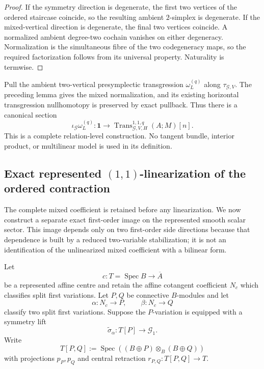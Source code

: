 \begin{proof}
If the symmetry direction is degenerate, the first two vertices of the ordered
staircase coincide, so the resulting ambient $2$-simplex is degenerate.  If the
mixed-vertical direction is degenerate, the final two vertices coincide.  A
normalized ambient degree-two cochain vanishes on either degeneracy.  Normalization
is the simultaneous fibre of the two codegeneracy maps, so the required
factorization follows from its universal property.  Naturality is termwise.
\end{proof}

\begin{construction}
\label{constr:symmetry-noether-ordered-mixed-presymplectic-contraction}
Pull the ambient two-vertical presymplectic transgression
$\omega_L^{(q)}$ along $\tau_{\mathcal G,V}$.  The preceding lemma gives the mixed
normalization, and its existing horizontal transgression nullhomotopy is preserved
by exact pullback.  Thus there is a canonical section
\[
\boxed{
\iota_{\mathcal G}\omega_L^{(q)}
:
\mathbf1
\longrightarrow
\operatorname{Trans}_{\mathcal G,V,H}^{1,1,q}(A;M)[n].
}
\]
This is a complete relation-level construction.  No tangent bundle, interior
product, or multilinear model is used in its definition.
\end{construction}

\subsection{Exact represented $(1,1)$-linearization of the ordered contraction}
\label{subsec:symmetry-noether-exact-represented-one-one-linearization}

The complete mixed coefficient is retained before any linearization.  We now
construct a separate exact first-order image on the represented smooth scalar
sector.  This image depends only on two first-order side directions because that
dependence is built by a reduced two-variable stabilization; it is not an
identification of the unlinearized mixed coefficient with a bilinear form.

Let
\[
c:T=\operatorname{Spec}B\longrightarrow\overline A
\]
be a represented affine centre and retain the affine cotangent coefficient $N_c$
which classifies split first variations.  Let $P,Q$ be connective
$B$-modules and let
\[
\alpha:N_c\longrightarrow P,
\qquad
\beta:N_c\longrightarrow Q
\]
classify two split first variations.  Suppose the $P$-variation is equipped with a
symmetry lift
\[
\widetilde\sigma_\alpha:T[P]\longrightarrow\mathcal G_1.
\]
Write
\[
T[P,Q]
:=
\operatorname{Spec}
\left((B\oplus P)\otimes_B(B\oplus Q)\right)
\]
with projections $p_P,p_Q$ and central retraction $r_{P,Q}:T[P,Q]\to T$.

